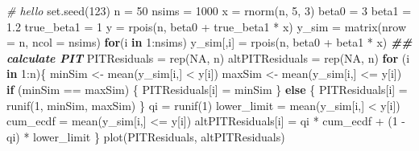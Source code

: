 \documentclass[
]{book}
\newenvironment{Shaded}{\begin{snugshade}}{\end{snugshade}}
\newcommand{\AttributeTok}[1]{\textcolor[rgb]{0.77,0.63,0.00}{#1}}
\newcommand{\CommentTok}[1]{\textcolor[rgb]{0.56,0.35,0.01}{\textit{#1}}}
\newcommand{\ConstantTok}[1]{\textcolor[rgb]{0.00,0.00,0.00}{#1}}
\newcommand{\ControlFlowTok}[1]{\textcolor[rgb]{0.13,0.29,0.53}{\textbf{#1}}}
\newcommand{\DecValTok}[1]{\textcolor[rgb]{0.00,0.00,0.81}{#1}}
\newcommand{\DocumentationTok}[1]{\textcolor[rgb]{0.56,0.35,0.01}{\textbf{\textit{#1}}}}
\newcommand{\FloatTok}[1]{\textcolor[rgb]{0.00,0.00,0.81}{#1}}
\newcommand{\FunctionTok}[1]{\textcolor[rgb]{0.00,0.00,0.00}{#1}}
\newcommand{\NormalTok}[1]{#1}
\newcommand{\OtherTok}[1]{\textcolor[rgb]{0.56,0.35,0.01}{#1}}
\newcommand{\SpecialCharTok}[1]{\textcolor[rgb]{0.00,0.00,0.00}{#1}}
\begin{document}
\begin{Shaded}
\begin{Highlighting}[]
\CommentTok{\# hello}
\FunctionTok{set.seed}\NormalTok{(}\DecValTok{123}\NormalTok{)}
\NormalTok{n }\OtherTok{=} \DecValTok{50}
\NormalTok{nsims }\OtherTok{=} \DecValTok{1000}
\NormalTok{x }\OtherTok{=} \FunctionTok{rnorm}\NormalTok{(n, }\DecValTok{5}\NormalTok{, }\DecValTok{3}\NormalTok{)}
\NormalTok{beta0 }\OtherTok{=} \DecValTok{3}
\NormalTok{beta1 }\OtherTok{=} \FloatTok{1.2}
\NormalTok{true\_beta1 }\OtherTok{=} \DecValTok{1}
\NormalTok{y }\OtherTok{=} \FunctionTok{rpois}\NormalTok{(n, beta0 }\SpecialCharTok{+}\NormalTok{ true\_beta1 }\SpecialCharTok{*}\NormalTok{ x)}
\NormalTok{y\_sim }\OtherTok{=} \FunctionTok{matrix}\NormalTok{(}\AttributeTok{nrow =}\NormalTok{ n, }\AttributeTok{ncol =}\NormalTok{ nsims) }
\ControlFlowTok{for}\NormalTok{(i }\ControlFlowTok{in} \DecValTok{1}\SpecialCharTok{:}\NormalTok{nsims)}
\NormalTok{  y\_sim[,i] }\OtherTok{=} \FunctionTok{rpois}\NormalTok{(n, beta0 }\SpecialCharTok{+}\NormalTok{ beta1 }\SpecialCharTok{*}\NormalTok{ x)}
\DocumentationTok{\#\# calculate PIT}
\NormalTok{PITResiduals }\OtherTok{=} \FunctionTok{rep}\NormalTok{(}\ConstantTok{NA}\NormalTok{, n)}
\NormalTok{altPITResiduals }\OtherTok{=} \FunctionTok{rep}\NormalTok{(}\ConstantTok{NA}\NormalTok{, n)}
\ControlFlowTok{for}\NormalTok{ (i }\ControlFlowTok{in} \DecValTok{1}\SpecialCharTok{:}\NormalTok{n)\{}
\NormalTok{  minSim }\OtherTok{\textless{}{-}} \FunctionTok{mean}\NormalTok{(y\_sim[i,] }\SpecialCharTok{\textless{}}\NormalTok{ y[i]) }
\NormalTok{  maxSim }\OtherTok{\textless{}{-}} \FunctionTok{mean}\NormalTok{(y\_sim[i,] }\SpecialCharTok{\textless{}=}\NormalTok{ y[i]) }
  \ControlFlowTok{if}\NormalTok{ (minSim }\SpecialCharTok{==}\NormalTok{ maxSim) \{}
\NormalTok{    PITResiduals[i] }\OtherTok{=}\NormalTok{ minSim}
\NormalTok{  \} }\ControlFlowTok{else}\NormalTok{ \{}
\NormalTok{    PITResiduals[i] }\OtherTok{=} \FunctionTok{runif}\NormalTok{(}\DecValTok{1}\NormalTok{, minSim, maxSim)}
\NormalTok{  \}}
\NormalTok{  qi }\OtherTok{=} \FunctionTok{runif}\NormalTok{(}\DecValTok{1}\NormalTok{)}
\NormalTok{  lower\_limit }\OtherTok{=} \FunctionTok{mean}\NormalTok{(y\_sim[i,] }\SpecialCharTok{\textless{}}\NormalTok{ y[i])}
\NormalTok{  cum\_ecdf }\OtherTok{=} \FunctionTok{mean}\NormalTok{(y\_sim[i,] }\SpecialCharTok{\textless{}=}\NormalTok{ y[i])}
\NormalTok{  altPITResiduals[i] }\OtherTok{=}\NormalTok{ qi }\SpecialCharTok{*}\NormalTok{ cum\_ecdf }\SpecialCharTok{+}\NormalTok{ (}\DecValTok{1} \SpecialCharTok{{-}}\NormalTok{ qi) }\SpecialCharTok{*}\NormalTok{ lower\_limit}
\NormalTok{\}}
\FunctionTok{plot}\NormalTok{(PITResiduals, altPITResiduals)}
\end{Highlighting}
\end{Shaded}
\end{document}
